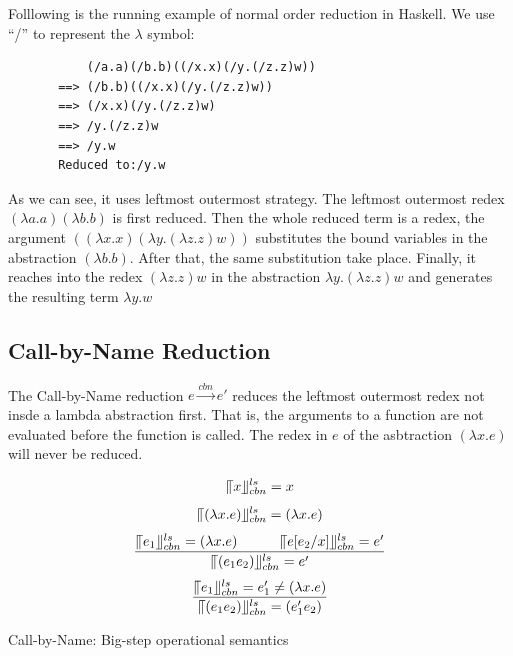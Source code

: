 \documentclass[a4paper,11pt,twoside]{report}
\begin{document}
Folllowing is the running example of normal order reduction in Haskell. We use ``/'' to represent the $\lambda$ symbol:

\begin{verbatim}
           (/a.a)(/b.b)((/x.x)(/y.(/z.z)w))
       ==> (/b.b)((/x.x)(/y.(/z.z)w))
       ==> (/x.x)(/y.(/z.z)w)
       ==> /y.(/z.z)w
       ==> /y.w
       Reduced to:/y.w
\end{verbatim}


As we can see, it uses leftmost outermost strategy. The leftmost outermost redex $(\lambda a.a)(\lambda b.b)$ is first reduced. Then the whole reduced term is a redex, the argument $((\lambda x.x)(\lambda y.(\lambda z.z)w))$ substitutes the bound variables in the abstraction $(\lambda b.b)$. After that, the same substitution take place. Finally, it reaches into the redex $(\lambda z.z)w$ in the abstraction $\lambda y.(\lambda z.z)w$ and generates the resulting term $\lambda y.w$


\subsection{Call-by-Name Reduction}{\label{subsec:cbn}}

The Call-by-Name reduction $e\xrightarrow{cbn} e'$ reduces the leftmost outermost redex not insde a lambda abstraction first. That is, the arguments to a function are not evaluated before the function is called. The redex in $e$ of the asbtraction $(\lambda x.e)$ will never be reduced. 


\begin{equation*}
\llceil x \rrfloor ^{ls} _{cbn} = x
\end{equation*}
\begin{equation*}
\llceil (\lambda x.e) \rrfloor ^{ls} _{cbn} = (\lambda x.e)
\end{equation*}
\begin{equation*}
\frac{\llceil e_1 \rrfloor ^{ls} _{cbn} = (\lambda x.e)\ \ \ \ \ \ \ \ \ \llceil e[e_2/x] \rrfloor ^{ls} _{cbn} = e'}{\llceil (e_1e_2) \rrfloor ^{ls} _{cbn} = e'}
\end{equation*}
\begin{equation*}
\frac{\llceil e_1 \rrfloor ^{ls} _{cbn} = e'_1\neq (\lambda x.e)}{\llceil (e_1e_2) \rrfloor ^{ls} _{cbn} = (e'_1e_2)}
\end{equation*}
\begin{center}
Call-by-Name: Big-step operational semantics
\end{center}
\end{document}
